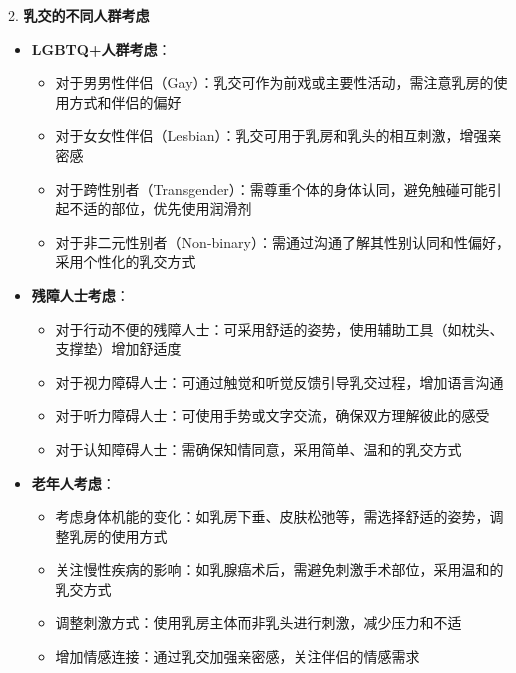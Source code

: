\documentclass[12pt,UTF8]{ctexbook}
\begin{document}
2. \textbf{乳交的不同人群考虑}
\begin{itemize}
	\item \textbf{LGBTQ+人群考虑}：
	\begin{itemize}
		\item 对于男男性伴侣（Gay）：乳交可作为前戏或主要性活动，需注意乳房的使用方式和伴侣的偏好
		\item 对于女女性伴侣（Lesbian）：乳交可用于乳房和乳头的相互刺激，增强亲密感
		\item 对于跨性别者（Transgender）：需尊重个体的身体认同，避免触碰可能引起不适的部位，优先使用润滑剂
		\item 对于非二元性别者（Non-binary）：需通过沟通了解其性别认同和性偏好，采用个性化的乳交方式
	\end{itemize}
	\item \textbf{残障人士考虑}：
	\begin{itemize}
		\item 对于行动不便的残障人士：可采用舒适的姿势，使用辅助工具（如枕头、支撑垫）增加舒适度
		\item 对于视力障碍人士：可通过触觉和听觉反馈引导乳交过程，增加语言沟通
		\item 对于听力障碍人士：可使用手势或文字交流，确保双方理解彼此的感受
		\item 对于认知障碍人士：需确保知情同意，采用简单、温和的乳交方式
	\end{itemize}
	\item \textbf{老年人考虑}：
	\begin{itemize}
		\item 考虑身体机能的变化：如乳房下垂、皮肤松弛等，需选择舒适的姿势，调整乳房的使用方式
		\item 关注慢性疾病的影响：如乳腺癌术后，需避免刺激手术部位，采用温和的乳交方式
		\item 调整刺激方式：使用乳房主体而非乳头进行刺激，减少压力和不适
		\item 增加情感连接：通过乳交加强亲密感，关注伴侣的情感需求
	\end{itemize}
\end{itemize}
\end{document}
